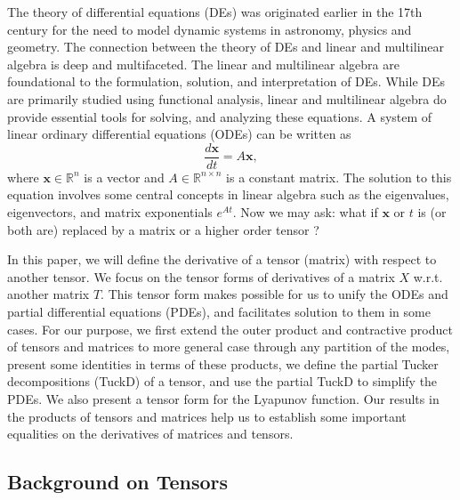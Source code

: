 \documentclass[11pt, oneside]{article}  %
\newcommand{\RR}{\mathbb{R}}
\newcommand{\bx}{\textbf{x}}
\begin{document}
The theory of differential equations (DEs) was originated earlier in the 17th century for the need to model dynamic systems in astronomy, 
physics and geometry. The connection between the theory of DEs and linear and multilinear algebra is deep and multifaceted. The 
linear and multilinear algebra are foundational to the formulation, solution, and interpretation of DEs.  While DEs are primarily studied 
using functional analysis, linear and multilinear algebra do provide essential tools for solving, and analyzing these equations. A system of 
linear ordinary differential equations (ODEs) can be written as 
\[ \frac{d\bx}{dt} = A\bx, \]
where $\bx\in\RR^n$ is a vector and $A\in\RR^{n\times n}$ is a constant matrix. The solution to this equation involves some central concepts 
in linear algebra such as the eigenvalues, eigenvectors, and matrix exponentials $e^{At}$.  Now we may ask: what if $\bx$ or $t$ is (or both 
are) replaced by a matrix or a higher order tensor ?  

In this paper, we will define the derivative of a tensor (matrix) with respect to another tensor.  We focus on the tensor forms of derivatives 
of a matrix $X$ w.r.t. another matrix $T$.  This tensor form makes possible for us to unify the ODEs and partial differential equations 
(PDEs), and facilitates solution to them in some cases.  For our purpose, we first extend the outer product and contractive product of 
tensors and matrices to more general case through any partition of the modes, present some identities in terms of these products, we define 
the partial Tucker decompositions (TuckD) of a tensor, and use the partial TuckD to simplify the PDEs.  We also present a tensor form for the Lyapunov function. Our results in the products of tensors and matrices help us to establish some important equalities on the derivatives of matrices and tensors.    

\subsection{Background on Tensors}
\label{sec1-1:backgrd}
\end{document}
